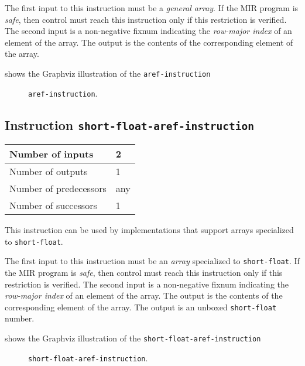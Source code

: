 The first input to this instruction must be a \emph{general array}.
If the MIR program is \emph{safe}, then control must reach this
instruction only if this restriction is verified.  The second input is
a non-negative fixnum indicating the \emph{row-major index} of an
element of the array.  The output is the contents of the corresponding
element of the array.

 shows the Graphviz illustration of the
\texttt{aref-instruction}

\begin{figure}
\begin{center}
\end{center}
\caption{\label{fig-aref-instruction}
\texttt{aref-instruction}.}
\end{figure}

\subsection{Instruction \texttt{short-float-aref-instruction}}
\label{mir-instruction-short-float-aref}

\begin{tabular}{|l|l|}
\hline
Number of inputs & 2\\
\hline
Number of outputs & 1\\
\hline
Number of predecessors & any\\
\hline
Number of successors & 1\\
\hline
\end{tabular}

This instruction can be used by implementations that support arrays
specialized to \texttt{short-float}.

The first input to this instruction must be an \emph{array}
specialized to \texttt{short-float}.  If the MIR program is
\emph{safe}, then control must reach this instruction only if this
restriction is verified.  The second input is a non-negative fixnum
indicating the \emph{row-major index} of an element of the array.  The
output is the contents of the corresponding element of the array.  The
output is an unboxed \texttt{short-float} number.

 shows the Graphviz illustration of the
\texttt{short-float-aref-instruction}

\begin{figure}
\begin{center}
\end{center}
\caption{\label{fig-short-float-aref-instruction}
\texttt{short-float-aref-instruction}.}
\end{figure}

